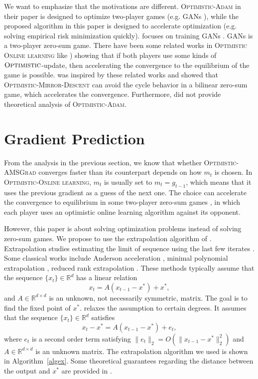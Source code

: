 \documentclass[11pt]{article}
\theoremstyle{k}
\begin{document}
We want to emphasize that the motivations are different. \textsc{Optimistic-Adam} in their paper is designed to optimize two-player games (e.g. GANs \cite{goodfellow2014generative}),
while the proposed algorithm in this paper is designed to accelerate optimization
(e.g. solving empirical risk minimization quickly).
\cite{DISZ18} focuses on training GANs \cite{goodfellow2014generative}. GANs is a two-player zero-sum game. There have been some related works in \textsc{Optimistic Online learning} like \cite{CJ12,RS13,SALS15})
showing that if both players use some kinds of $\textsc{Optimistic}$-update,
then accelerating the convergence to the equilibrium of the game is possible.
\cite{DISZ18} was inspired by these related works and showed that \textsc{Optimistic-Mirror-Descent}
can avoid the cycle behavior in a bilinear zero-sum game, which accelerates the convergence. Furthermore, \cite{DISZ18} did not provide theoretical analysis of \textsc{Optimistic-Adam}.

\section{Gradient Prediction} \label{sec:predict_m}

From the analysis in the previous section, we know that whether \textsc{Optimistic-AMSGrad}
converges faster than its counterpart depends on how $m_{t}$ is chosen.
In \textsc{Optimistic-Online learning}, $m_{t}$ is usually set to $m_{t}= g_{t-1}$,
which means that it uses the previous gradient as a guess of the next one.
The choice can accelerate the convergence to equilibrium in some two-player zero-sum games
\cite{RS13,SALS15,DISZ18}, in which each player uses an optimistic online learning algorithm
against its opponent.

However, this paper is about solving optimization problems instead of solving zero-sum games. 
We propose to use the extrapolation algorithm of \cite{SAB16}.
Extrapolation studies estimating the limit of sequence using the last few iterates
\cite{BZ13}. 
Some classical works include Anderson acceleration \cite{WN11}, minimal polynomial extrapolation \cite{CJ76}, reduced rank extrapolation \cite{E79}.
These methods typically assume that the sequence $\{x_t\} \in \mathbb R^d$
has a linear relation
\begin{equation} \label{vvv}
x_t = A( x_{t-1} - x^* ) + x^*,
\end{equation}
and $A \in \mathbb R^{d \times d}$ is an unknown, not necessarily symmetric, matrix.
The goal is to find the fixed point of $x^{*}$.
\cite{SAB16} relaxes the assumption to certain degrees.
It assumes that the sequence $\{x_t\} \in \mathbb R^d$ satisfies
\begin{equation} \label{nox}
x_t - x^* = A( x_{t-1} - x^* ) + e_t,
\end{equation}
where $e_t$ is a second order term satisfying $\| e_t \|_2  = O( \| x_{t-1} - x^* \|_2^2)$
and $A \in \mathbb R^{d \times d}$ is an unknown matrix.
The extrapolation algorithm we used is shown in Algorithm~\ref{algex}.
Some theoretical guarantees regarding the distance between the output and $x^*$ are provided in \cite{SAB16}.
\end{document}
